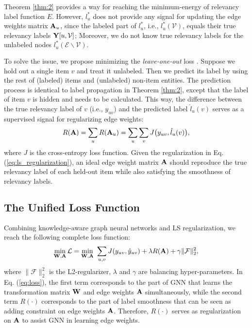 \documentclass[sigconf]{acmart}
\begin{document}
		Theorem \ref{thm:2} provides a way for reaching the minimum-energy of relevancy label function $E$.
		However, $l_u^*$ does not provide any signal for updating the edge weights matrix ${\bf A}_u$, since the labeled part of $l_u^*$, i.e., $l_u^* (\mathcal V)$, equals their true relevancy labels ${\bf Y}[u, \mathcal V]$;
		Moreover, we do not know true relevancy labels for the unlabeled nodes $l_u^* (\mathcal E \backslash \mathcal V)$.
		
To solve the issue, we propose minimizing the \textit{leave-one-out} loss \cite{zhang2007hyperparameter}.
		Suppose we hold out a single item $v$ and treat it unlabeled.
		Then we predict its label by using the rest of (labeled) items and (unlabeled) non-item entities.
		The prediction process is identical to label propagation in Theorem \ref{thm:2}, except that the label of item $v$ is hidden and needs to be calculated.
		This way, the difference between the true relevancy label of $v$ (i.e., $y_{uv}$) and the predicted label $\hat l_u(v)$ serves as a supervised signal for regularizing edge weights:
		\begin{equation}
		\label{eq:ls_regularization}
			R({\bf A}) = \sum_{u} R({\bf A}_u) = \sum_{u} \sum_{v} J \big( y_{uv}, \hat l_u(v) \big),
		\end{equation}
		where $J$ is the cross-entropy loss function.
		Given the regularization in Eq. (\ref{eq:ls_regularization}), an ideal edge weight matrix $\bf A$ should reproduce the true relevancy label of each held-out item while also satisfying the smoothness of relevancy labels.
		
		
		
	\subsection{The Unified Loss Function}
		Combining knowledge-aware graph neural networks and LS regularization, we reach the following complete loss function:
		\begin{equation}
		\label{eq:loss}
			\min_{\bf{W}, \bf{A}} \mathcal L = \min_{\bf{W}, \bf{A}} \ \sum_{u, v} J(y_{uv}, \hat y_{uv}) + \lambda R({\bf A}) + \gamma \| \mathcal F \|^2_2,
		\end{equation}
		where $\| \mathcal F \|^2_2$ is the L2-regularizer, $\lambda$ and $\gamma$ are balancing hyper-parameters.
		In Eq. (\ref{eq:loss}), the first term corresponds to the part of GNN that learns the transformation matrix $\bf{W}$ and edge weights $\bf{A}$ simultaneously, while the second term $R(\cdot)$ corresponds to the part of label smoothness that can be seen as adding constraint on edge weights $\bf{A}$.
		Therefore, $R(\cdot)$ serves as regularization on $\bf{A}$ to assist GNN in learning edge weights.
		
\end{document}
